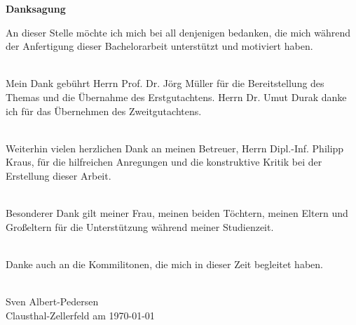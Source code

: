 \newpage
\thispagestyle{empty}
\begin{center}
\LARGE\bfseries Danksagung\linebreak[4]
\end{center}


An dieser Stelle möchte ich mich bei all denjenigen bedanken, die mich während der Anfertigung dieser Bachelorarbeit unterstützt und motiviert haben. \\\

Mein Dank gebührt Herrn Prof. Dr. Jörg Müller für die Bereitstellung des Themas und die Übernahme des Erstgutachtens.
Herrn Dr. Umut Durak danke ich für das Übernehmen des Zweitgutachtens. \\\

Weiterhin vielen herzlichen Dank an meinen Betreuer, Herrn Dipl.-Inf. Philipp Kraus, für die hilfreichen Anregungen und die konstruktive Kritik bei der Erstellung dieser Arbeit. \\\

Besonderer Dank gilt meiner Frau, meinen beiden Töchtern, meinen Eltern und Großeltern für die Unterstützung während meiner Studienzeit.  \\\

Danke auch an die Kommilitonen, die mich in dieser Zeit begleitet haben. \\\

Sven Albert-Pedersen\\
Clausthal-Zellerfeld am \today
